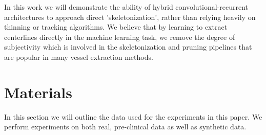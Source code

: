 \documentclass[journal,transmag]{IEEEtran}
\begin{document}
In this work we will demonstrate the ability of hybrid convolutional-recurrent architectures to approach direct 'skeletonization', rather than relying heavily on thinning or tracking algorithms. We believe that by learning to extract centerlines directly in the machine learning task, we remove the degree of subjectivity which is involved in the skeletonization and pruning pipelines that are popular in many vessel extraction methods.

\section{Materials}

In this section we will outline the data used for the experiments in this paper. We perform experiments on both real, pre-clinical data as well as synthetic data.
\end{document}
